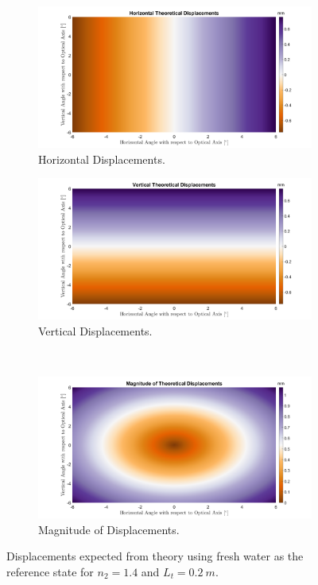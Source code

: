 \documentclass{article}
\begin{document}
\begin{figure}
\begin{subfigure}[b]{.5\linewidth}
\centering \includegraphics[width=\linewidth]{hordispnmaxrefstatenmin.png}
\caption{Horizontal Displacements.}\label{fig:3a}
\end{subfigure}%
\begin{subfigure}[b]{.5\linewidth}
\centering\large \includegraphics[width=\linewidth]{verdispnmaxrefstatenmin.png}
\caption{Vertical Displacements.}\label{fig:3b}
\end{subfigure} \\
\begin{subfigure}[b]{\linewidth}
\centering \includegraphics[width=\linewidth]{magndispnmaxrefstatenmin.png}
\caption{Magnitude of Displacements.}\label{fig:3c}
\end{subfigure}%
\caption{Displacements expected from theory using fresh water as the reference state for $n_2 = 1.4$ and $L_t = \SI{0.2}{m}$.}\label{fig:3}
\end{figure}
\end{document}
